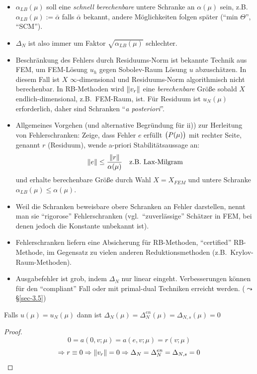 \begin{bem} \beginwithlistbem
	\begin{itemize}
		\item $\alpha_{LB}(\mu)$ soll eine \emph{schnell berechenbare} untere Schranke an $\alpha(\mu)$ sein, z.B.\ $\alpha_{LB}(\mu) := \bar \alpha$ falls $\bar \alpha$ bekannt, andere Möglichkeiten folgen später (``min $\Theta$'', ``SCM'').
		\item $\Delta_N$ ist also immer um Faktor $\sqrt{\alpha_{LB}(\mu)}$ schlechter.
		\item Beschränkung des Fehlers durch Residuums-Norm ist bekannte Technik aus FEM, um FEM-Lösung $u_h$ gegen Sobolev-Raum Lösung $u$ abzuschätzen.
			In diesem Fall ist $X$ $\infty$-dimensional und Residuums-Norm algorithmisch nicht berechenbar.
			In RB-Methoden wird $\|v_r\|$ eine \emph{berechenbare} Größe sobald $X$ endlich-dimensional, z.B.\ FEM-Raum, ist.
			Für Residuum ist $u_N(\mu)$ erforderlich, daher sind Schranken ``\emph{a posteriori}''.
		\item Allgemeines Vorgehen (und alternative Begründung für ii)) zur Herleitung von Fehlerschranken: Zeige, dass Fehler $e$ erfüllt $\big(P(\mu)\big)$ mit rechter Seite, genannt $r$ (Residuum), wende a-priori Stabilitätsaussage an:
			\[
				\|e\| \leq \frac{\|r\|}{\alpha(\mu)} \quad \text{z.B.\ Lax-Milgram}
			\]
			und erhalte berechenbare Größe durch Wahl $X=X_{FEM}$ und untere Schranke $\alpha_{LB}(\mu) \leq \alpha(\mu)$.
		\item Weil die Schranken beweisbare obere Schranken an Fehler darstellen, nennt man sie ``rigorose'' Fehlerschranken (vgl.\ ``zuverlässige'' Schätzer in FEM, bei denen jedoch die Konstante unbekannt ist).
		\item Fehlerschranken liefern eine Absicherung für RB-Methoden, ``certified'' RB-Methode, im Gegensatz zu vielen anderen Reduktionsmethoden (z.B.\ Krylov-Raum-Methoden).
		\item Ausgabefehler ist grob, indem $\Delta_N$ nur linear eingeht.
			Verbesserungen können für den ``compliant'' Fall oder mit primal-dual Techniken erreicht werden. ($\leadsto$ §\ref{sec-3.5})
	\end{itemize}
\end{bem}

\begin{kor} \label{3.14}
	Falls $u(\mu) = u_N(\mu)$ dann ist $\Delta_N(\mu) = \Delta_N^{en}(\mu) = \Delta_{N,s}(\mu) = 0$

	\begin{proof}
		\[
			0 = a(0,v;\mu) = a(e,v;\mu) = r(v;\mu)
		\]
		\[
			\Rightarrow r \equiv 0 \Rightarrow \|v_r\| = 0 \Rightarrow \Delta_N = \Delta_N^{en} = \Delta_{N,s} = 0
		\]
	\end{proof}
\end{kor}

